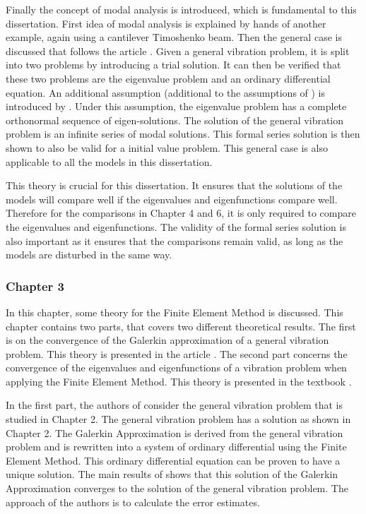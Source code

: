 \documentclass[../main.tex]{subfiles}
\begin{document}
Finally the concept of modal analysis is introduced, which is fundamental to this dissertation. First idea of modal analysis is explained by hands of another example, again using a cantilever Timoshenko beam. Then the general case is discussed that follows the article \cite{CVV18}. Given a general vibration problem, it is split into two problems by introducing a trial solution. It can then be verified that these two problems are the eigenvalue problem and an ordinary differential equation. An additional assumption (additional to the assumptions of \cite{VV02}) is introduced by \cite{CVV18}. Under this assumption, the eigenvalue problem has a complete orthonormal sequence of eigen-solutions. The solution of the general vibration problem is an infinite series of modal solutions. This formal series solution is then shown to also be valid for a initial value problem. This general case is also applicable to all the models in this dissertation.

This theory is crucial for this dissertation. It ensures that the solutions of the models will compare well if the eigenvalues and eigenfunctions compare well. Therefore for the comparisons in Chapter 4 and 6, it is only required to compare the eigenvalues and eigenfunctions. The validity of the formal series solution is also important as it ensures that the comparisons remain valid, as long as the models are disturbed in the same way.

\subsubsection{Chapter 3}
In this chapter, some theory for the Finite Element Method is discussed. This chapter contains two parts, that covers two different theoretical results. The first is on the convergence of the Galerkin approximation of a general vibration problem. This theory is presented in the article \cite{BV13}. The second part concerns the convergence of the eigenvalues and eigenfunctions of a vibration problem when applying the Finite Element Method. This theory is presented in the textbook \cite{SF73}. 

In the first part, the authors of \cite{BV13} consider the general vibration problem that is studied in Chapter 2. The general vibration problem has a solution as shown in Chapter 2. The Galerkin Approximation is derived from the general vibration problem and is rewritten into a system of ordinary differential using the Finite Element Method. This ordinary differential equation can be proven to have a unique solution. The main results of \cite{BV13} shows that this solution of the Galerkin Approximation converges to the solution of the general vibration problem. The approach of the authors is to calculate the error estimates.
\end{document}
